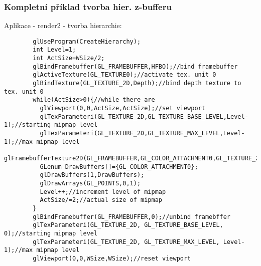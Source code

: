 \begin{frame}[fragile]
\frametitle{Kompletní příklad tvorba hier. z-bufferu}
		Aplikace - render2 - tvorba hierarchie:
		{\tiny
		\begin{verbatim}
		glUseProgram(CreateHierarchy);
		int Level=1;
		int ActSize=WSize/2;
		glBindFramebuffer(GL_FRAMEBUFFER,HFBO);//bind framebuffer
		glActiveTexture(GL_TEXTURE0);//activate tex. unit 0
		glBindTexture(GL_TEXTURE_2D,Depth);//bind depth texture to tex. unit 0
		while(ActSize>0){//while there are
		  glViewport(0,0,ActSize,ActSize);//set viewport
		  glTexParameteri(GL_TEXTURE_2D,GL_TEXTURE_BASE_LEVEL,Level-1);//starting mipmap level
		  glTexParameteri(GL_TEXTURE_2D,GL_TEXTURE_MAX_LEVEL,Level-1);//max mipmap level
		  glFramebufferTexture2D(GL_FRAMEBUFFER,GL_COLOR_ATTACHMENT0,GL_TEXTURE_2D,Depth,Level);
		  GLenum DrawBuffers[]={GL_COLOR_ATTACHMENT0};
		  glDrawBuffers(1,DrawBuffers);
		  glDrawArrays(GL_POINTS,0,1);
		  Level++;//increment level of mipmap
		  ActSize/=2;//actual size of mipmap
		}
		glBindFramebuffer(GL_FRAMEBUFFER,0);//unbind framebffer
		glTexParameteri(GL_TEXTURE_2D, GL_TEXTURE_BASE_LEVEL, 0);//starting mipmap level
		glTexParameteri(GL_TEXTURE_2D, GL_TEXTURE_MAX_LEVEL, Level-1);//max mipmap level
		glViewport(0,0,WSize,WSize);//reset viewport
		\end{verbatim}
		}
\end{frame}


